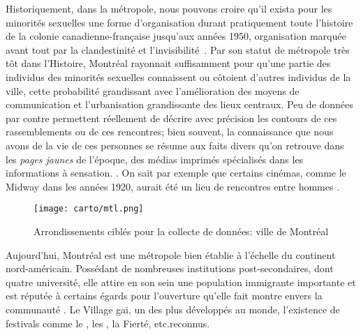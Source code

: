 Historiquement, dans la métropole, nous pouvons croire qu'il exista pour les minorités sexuelles une forme d'organisation durant pratiquement toute l'histoire de la colonie canadienne-française jusqu’aux années 1950, organisation marquée avant tout par la clandestinité et l'invisibilité~\citep{Higgins1999}. 
Par son statut de métropole très tôt dans l'Histoire, Montréal rayonnait suffisamment pour qu'une partie des individus des minorités sexuelles connaissent ou côtoient d'autres individus de la ville, cette probabilité grandissant avec l'amélioration des moyens de communication et l'urbanisation grandissante des lieux centraux. 
Peu de données par contre permettent réellement de décrire avec précision les contours de ces rassemblements ou de ces rencontres; bien souvent, la connaissance que nous avons de la vie de ces personnes se résume aux faits divers qu'on retrouve dans les \emph{pages jaunes} de l'époque, des médias imprimés spécialisés dans les informations à sensation. 
\citep[]{Higgins1999}. 
On sait par exemple que certains cinémas, comme le Midway dans les années 1920, aurait été un lieu de rencontres entre hommes\citep[30]{Higgins1999} .
\begin{figure}[ht]
	\centering
	\texttt{[image: carto/mtl.png]}
	\caption{Arrondissements ciblés pour la collecte de données: ville de
    Montréal}\label{fig:espaces_montreal}
\end{figure}
Aujourd'hui, Montréal est une métropole bien établie à l'échelle du continent nord-américain. 
Possédant de nombreuses institutions post-secondaires, dont quatre université, elle attire en son sein une population immigrante importante et est réputée à certains égards pour l'ouverture qu'elle fait montre envers la communauté \lgbt{}. 
Le Village gai, un des plus développés au monde, l'existence de festivals comme le , les , la Fierté, etc.\@sont reconnus.

